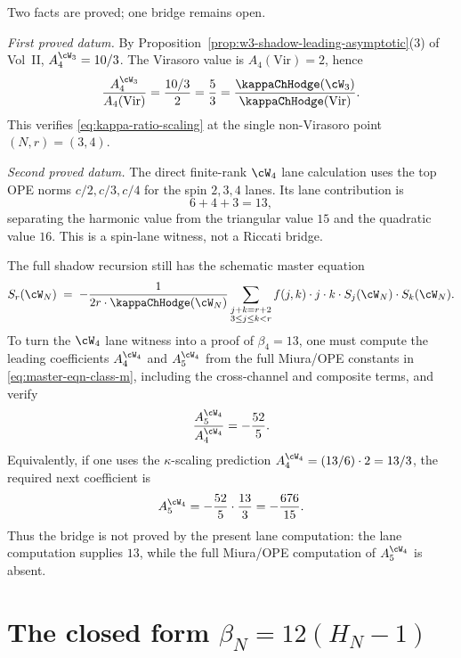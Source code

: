 \begin{remark}
Two facts are proved; one bridge remains open.

\emph{First proved datum.} By
Proposition~\ref{prop:w3-shadow-leading-asymptotic}(3) of Vol~II,
$A_4^{\cW_3} = 10/3$. The Virasoro value is
$A_4(\mathrm{Vir}) = 2$, hence
\[
 \frac{A_4^{\cW_3}}{A_4(\mathrm{Vir})}
 =
 \frac{10/3}{2}
 =
 \frac{5}{3}
 =
 \frac{\kappaChHodge(\cW_3)}{\kappaChHodge(\mathrm{Vir})}.
\]
This verifies \eqref{eq:kappa-ratio-scaling} at the single
non-Virasoro point $(N,r)=(3,4)$.

\emph{Second proved datum.} The direct finite-rank $\cW_4$ lane
calculation uses the top OPE norms \(c/2,c/3,c/4\) for the spin
\(2,3,4\) lanes. Its lane contribution is
\[
 6+4+3=13,
\]
separating the harmonic value from the triangular value \(15\) and the
quadratic value \(16\). This is a spin-lane witness, not a Riccati
bridge.

The full shadow recursion still has the schematic master equation
\begin{equation}
\label{eq:master-eqn-class-m}
S_r(\cW_N)
\;=\;
-\frac{1}{2 r \cdot \kappaChHodge(\cW_N)}
\sum_{\substack{j + k = r + 2 \\ 3 \le j \le k < r}}
 f(j, k) \cdot j \cdot k \cdot S_j(\cW_N) \cdot S_k(\cW_N).
\end{equation}
To turn the \(\cW_4\) lane witness into a proof of
\(\beta_4=13\), one must compute the leading coefficients
\(A_4^{\cW_4}\) and \(A_5^{\cW_4}\) from the full Miura/OPE constants in
\eqref{eq:master-eqn-class-m}, including the cross-channel and composite
terms, and verify
\begin{equation}
\label{eq:w4-missing-riccati-bridge}
 \frac{A_5^{\cW_4}}{A_4^{\cW_4}}
 =
 -\frac{52}{5}.
\end{equation}
Equivalently, if one uses the \(\kappa\)-scaling prediction
\(A_4^{\cW_4}= (13/6)\cdot 2=13/3\), the required next coefficient is
\[
 A_5^{\cW_4}
 =
 -\frac{52}{5}\cdot \frac{13}{3}
 =
 -\frac{676}{15}.
\]
Thus the bridge is not proved by the present lane computation: the
lane computation supplies \(13\), while the full Miura/OPE computation
of \(A_5^{\cW_4}\) is absent.
\end{remark}

\section{The closed form $\beta_N = 12(H_N - 1)$}
\label{sec:beta-N-closed-form-theorem}


